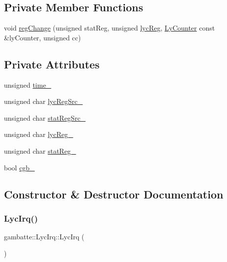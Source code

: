 \subsection*{Private Member Functions}
\begin{DoxyCompactItemize}
\item 
void \hyperlink{classgambatte_1_1LycIrq_a1c55846be851069006470cf938d55af5}{reg\+Change} (unsigned stat\+Reg, unsigned \hyperlink{classgambatte_1_1LycIrq_aa0c87be5b827d0a1bf9ed54e5e8e0786}{lyc\+Reg}, \hyperlink{classgambatte_1_1LyCounter}{Ly\+Counter} const \&ly\+Counter, unsigned cc)
\end{DoxyCompactItemize}
\subsection*{Private Attributes}
\begin{DoxyCompactItemize}
\item 
unsigned \hyperlink{classgambatte_1_1LycIrq_a7d1f9705467f2bd76cd1cb03d1dcdae7}{time\+\_\+}
\item 
unsigned char \hyperlink{classgambatte_1_1LycIrq_ad6b42e2bee684f6530eb6b35f3aa4fd6}{lyc\+Reg\+Src\+\_\+}
\item 
unsigned char \hyperlink{classgambatte_1_1LycIrq_a55a0557978976b6ae82c0de34f99f544}{stat\+Reg\+Src\+\_\+}
\item 
unsigned char \hyperlink{classgambatte_1_1LycIrq_a370d3e2248391d59eb72d7bb9aba2703}{lyc\+Reg\+\_\+}
\item 
unsigned char \hyperlink{classgambatte_1_1LycIrq_aba273c6daaa946a6afeadbe3d0f65bb2}{stat\+Reg\+\_\+}
\item 
bool \hyperlink{classgambatte_1_1LycIrq_a81fb1d26e2da3aa1a2feaee9b66acd49}{cgb\+\_\+}
\end{DoxyCompactItemize}


\subsection{Constructor \& Destructor Documentation}
\mbox{\label{classgambatte_1_1LycIrq_aad94ac6413d3f849b688636273420fff}} 
\subsubsection{\texorpdfstring{Lyc\+Irq()}{LycIrq()}}
{\footnotesize\ttfamily gambatte\+::\+Lyc\+Irq\+::\+Lyc\+Irq (\begin{DoxyParamCaption}{ }\end{DoxyParamCaption})}



